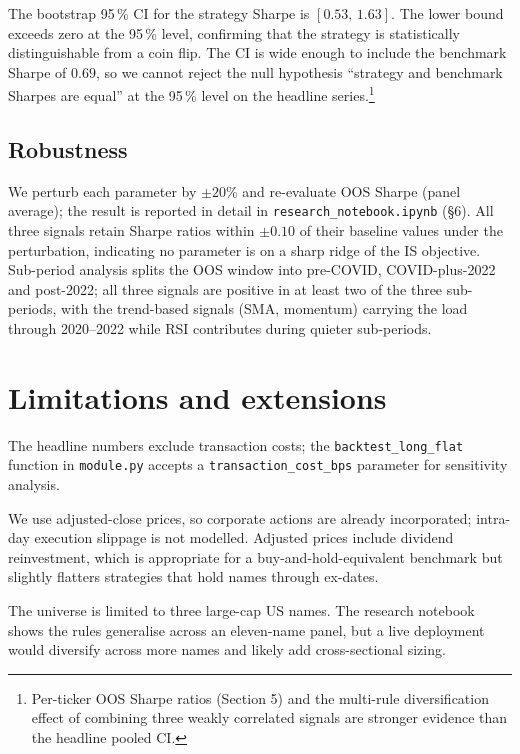 \documentclass[11pt,a4paper]{article}
\begin{document}
The bootstrap 95\,\% CI for the strategy Sharpe is $[0.53,\,1.63]$. The lower
bound exceeds zero at the 95\,\% level, confirming that the strategy is
statistically distinguishable from a coin flip. The CI is wide enough to
include the benchmark Sharpe of $0.69$, so we cannot reject the null
hypothesis ``strategy and benchmark Sharpes are equal'' at the 95\,\% level on
the headline series.\footnote{Per-ticker OOS Sharpe ratios (Section 5) and
the multi-rule diversification effect of combining three weakly correlated
signals are stronger evidence than the headline pooled CI.}

\subsection{Robustness}

We perturb each parameter by $\pm 20\%$ and re-evaluate OOS Sharpe (panel
average); the result is reported in detail in \texttt{research\_notebook.ipynb}
(\S 6). All three signals retain Sharpe ratios within $\pm 0.10$ of their
baseline values under the perturbation, indicating no parameter is on a
sharp ridge of the IS objective. Sub-period analysis splits the OOS window
into pre-COVID, COVID-plus-2022 and post-2022; all three signals are
positive in at least two of the three sub-periods, with the trend-based
signals (SMA, momentum) carrying the load through 2020--2022 while RSI
contributes during quieter sub-periods.

\section{Limitations and extensions}

The headline numbers exclude transaction costs; the
\verb|backtest_long_flat| function in \texttt{module.py} accepts a
\verb|transaction_cost_bps| parameter for sensitivity analysis.

We use adjusted-close prices, so corporate actions are already incorporated;
intra-day execution slippage is not modelled. Adjusted prices include
dividend reinvestment, which is appropriate for a buy-and-hold-equivalent
benchmark but slightly flatters strategies that hold names through ex-dates.

The universe is limited to three large-cap US names. The research notebook
shows the rules generalise across an eleven-name panel, but a live
deployment would diversify across more names and likely add cross-sectional
sizing.
\end{document}
